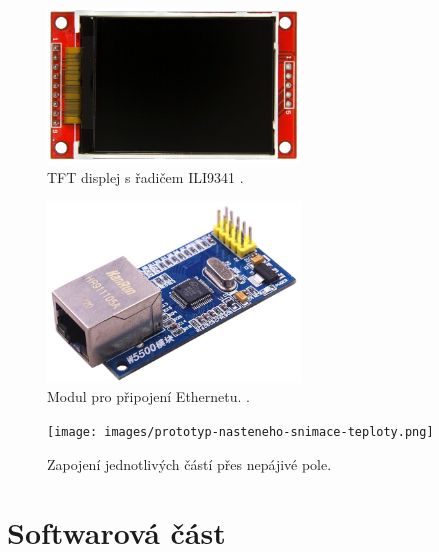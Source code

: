 \begin{figure}[H]
    \centering
    \includegraphics[width=0.6\textwidth]{images/predni-cast-tft-lcd-320x240-ili9341.png}
    \caption[TFT displej s řadičem ILI9341.]{TFT displej s řadičem ILI9341 \cite{tft-lcd-320x240-ili9341}.}
    \label{fig:predni-cast-tft-lcd-320x240-ili9341}
\end{figure}

\begin{figure}[H]
    \centering
    \includegraphics[width=0.6\textwidth]{images/modul-w5500.png}
    \caption[Modul pro připojení Ethernetu.]{Modul pro připojení Ethernetu. \cite{modul-w5500}.}
    \label{fig:modul-w5500}
\end{figure}

\begin{figure}[H]
    \centering
    \texttt{[image: images/prototyp-nasteneho-snimace-teploty.png]}
    \caption{Zapojení jednotlivých částí přes nepájivé pole.}
    \label{fig:prototyp-nasteneho-snimace-teploty}
\end{figure}

\section{Softwarová část}

